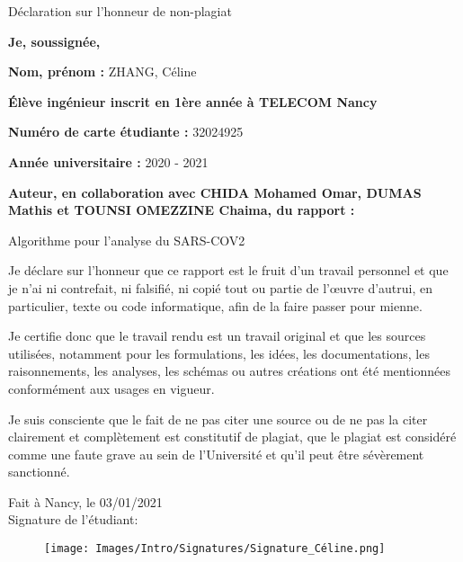

%

\begin{center}
\LARGE
    Déclaration sur l'honneur de non-plagiat
\end{center}

\textbf{Je, soussignée,} 

\textbf{Nom, prénom :} ZHANG, Céline

\textbf{Élève ingénieur inscrit en 1ère année à TELECOM Nancy} 

\textbf{Numéro de carte étudiante :} 32024925

\textbf{Année universitaire :} 2020 - 2021 

\textbf{Auteur, en collaboration avec CHIDA Mohamed Omar, DUMAS Mathis et TOUNSI OMEZZINE Chaima, du rapport : } 

\begin{center}
\Large
    Algorithme pour l'analyse du SARS-COV2 
\end{center}


Je déclare sur l’honneur que ce rapport est le fruit d’un travail personnel et que je n’ai ni contrefait, ni falsifié, ni copié tout ou partie de l’œuvre d’autrui, en particulier, texte ou code informatique, afin de la faire passer pour mienne.

Je certifie donc que le travail rendu est un travail original et que les sources utilisées, notamment pour les formulations, les idées, les documentations, les raisonnements, les analyses, les schémas ou autres créations ont été mentionnées conformément aux usages en vigueur.

Je suis consciente que le fait de ne pas citer une source ou de ne pas la citer clairement et complètement est constitutif de plagiat, que le plagiat est considéré comme une faute grave au sein de l’Université et qu’il peut être sévèrement sanctionné. \\


\begin{flushright}
Fait à Nancy, le 03/01/2021 \\
Signature de l'étudiant:
\end{flushright}
\begin{figure}[!h]
    \begin{flushright}
        \texttt{[image: Images/Intro/Signatures/Signature\_Céline.png]}
    \end{flushright}
\end{figure}



